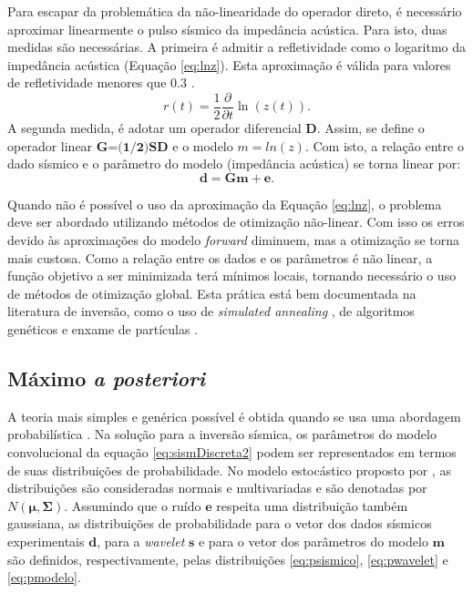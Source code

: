 Para escapar da problemática da não-linearidade do operador direto, é
necessário aproximar linearmente o pulso sísmico da impedância acústica.
Para isto, duas medidas são necessárias. A primeira é admitir a 
refletividade como o logaritmo da impedância acústica (Equação \ref{eq:lnz}).
Esta aproximação é válida para valores de refletividade menores que $0.3$ \cite{Buland01012003}.
\begin{equation}
r(t) = \frac{1}{2}\frac{\partial}{\partial t}\ln(z(t)).
\label{eq:lnz}
\end{equation}
A segunda medida, é adotar um operador diferencial $\textbf{D}$. Assim,
se define o operador linear $\textbf{G=(1/2)SD}$ e o modelo $m=ln(z)$.
Com isto, a relação entre o dado sísmico e o parâmetro do modelo (impedância acústica)
se torna linear por:
\begin{equation}
\label{eq:sismDiscreta2}
\mathbf{d = Gm + e}.
\end{equation}

Quando não é possível o uso da aproximação da Equação \ref{eq:lnz}, o problema
deve ser abordado utilizando métodos de otimização não-linear. Com isso os erros
devido às aproximações do modelo \textit{forward} diminuem, mas a otimização se
torna mais custosa. Como a relação entre os dados e os parâmetros é não linear, a
função objetivo a ser minimizada terá mínimos locais, tornando necessário
o uso de métodos de otimização global. Esta prática está bem documentada na
literatura de inversão, como o uso de \textit{simulated annealing}
\citep{max_inv_simulated}, de algoritmos genéticos \citep{MallickGeneticInve} e
enxame de partículas \citep{zhe_nonlinear}. 

\subsection{Máximo \textit{a posteriori}}
\label{sec:map}

A teoria mais simples e genérica possível é obtida quando se usa uma
abordagem probabilística \citep{tarantola}. Na solução para a inversão
sísmica, os parâmetros do modelo convolucional da equação \ref{eq:sismDiscreta2}
podem ser representados em termos de suas distribuições de probabilidade.
No modelo estocástico proposto por \cite{leandroGRSL}, as distribuições
são consideradas normais e multivariadas e são denotadas por $N(\boldsymbol{\mu},\boldsymbol{\Sigma})$.
Assumindo que o ruído $\boldsymbol{e}$ respeita uma distribuição também gaussiana,
as distribuições de probabilidade para o vetor dos dados sísmicos experimentais
$\boldsymbol{d}$, para a \textit{wavelet} $\boldsymbol{s}$ e para
o vetor dos parâmetros do modelo $\boldsymbol{m}$ são
definidos, respectivamente, pelas distribuições \ref{eq:psismico}, \ref{eq:pwavelet} e \ref{eq:pmodelo}.

